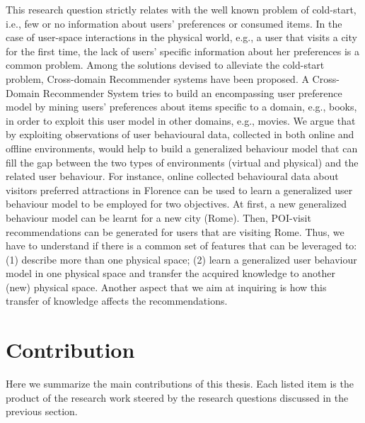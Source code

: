 This research question strictly relates with the well known problem of cold-start, i.e., few or no information about users' preferences or consumed items.
In the case of user-space interactions in the physical world, e.g., a user that visits a city for the first time, the lack of users' specific information about her preferences is a common problem. 
Among the solutions devised to alleviate the cold-start problem, Cross-domain Recommender systems \cite{crossdomain:RSdef} have been proposed. A Cross-Domain Recommender System tries to build an encompassing user preference model by mining users' preferences about items specific to a domain, e.g., books, in order to exploit this user model in other domains, e.g., movies.
We argue that by exploiting observations of user behavioural data, collected in both online and offline environments, would help to build a generalized behaviour model that can fill the gap between the two types of environments (virtual and physical) and the related user behaviour.
For instance, online collected behavioural data about visitors preferred attractions in Florence can be used to learn a generalized user behaviour model to be employed for two objectives. At first, a new generalized behaviour model can be learnt for a new city (Rome). Then, POI-visit recommendations can be generated for users that are visiting Rome.
Thus, we have to understand if there is a common set of features that can be leveraged to: (1) describe more than one physical space; (2) learn a generalized user behaviour model in one physical space and transfer the acquired knowledge to another (new) physical space. Another aspect that we aim at inquiring is how this transfer of knowledge affects the recommendations. \newline

\section{Contribution}

Here we summarize the main contributions of this thesis. Each listed item is the product of the research work steered by the research questions discussed in the previous section. \newline

